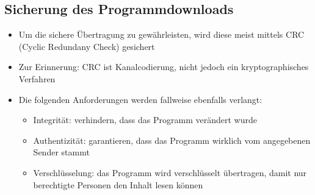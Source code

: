 \subsection{Sicherung des Programmdownloads}
\begin{itemize}
  \item Um die sichere Übertragung zu gewährleisten, wird diese meist mittels CRC (Cyclic Redundany Check) gesichert
  \item Zur Erinnerung: CRC ist Kanalcodierung, nicht jedoch ein kryptographisches Verfahren
  \item Die folgenden Anforderungen werden fallweise ebenfalls verlangt:
  \begin{itemize}
    \item Integrität: verhindern, dass das Programm verändert wurde
    \item Authentizität: garantieren, dass das Programm wirklich vom angegebenen Sender stammt
    \item Verschlüsselung: das Programm wird verschlüsselt übertragen, damit nur berechtigte Personen den Inhalt lesen können
  \end{itemize}
\end{itemize}
